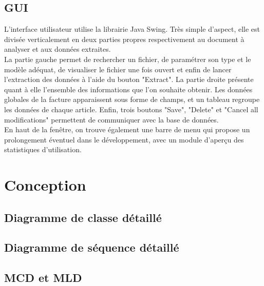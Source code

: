 \subsection{GUI}
L'interface utilisateur utilise la librairie Java Swing. Très simple d'aspect, elle est divisée verticalement en deux parties propres respectivement au document à analyser et aux données extraites.\\

La partie gauche permet de rechercher un fichier, de paramétrer son type et le modèle adéquat, de visualiser le fichier une fois ouvert et enfin de lancer l'extraction des données à l'aide du bouton "Extract".
La partie droite présente quant à elle l'ensemble des informations que l'on souhaite obtenir. Les données globales de la facture apparaissent sous forme de champs, et un tableau regroupe les données de chaque article.
Enfin, trois boutons "Save", "Delete" et "Cancel all modifications" permettent de communiquer avec la base de données.\\

En haut de la fenêtre, on trouve également une barre de menu qui propose un prolongement éventuel dans le développement, avec un module d'aperçu des statistiques d'utilisation.

\section{Conception}

\subsection{Diagramme de classe détaillé}

\subsection{Diagramme de séquence détaillé}

\subsection{MCD et MLD}
